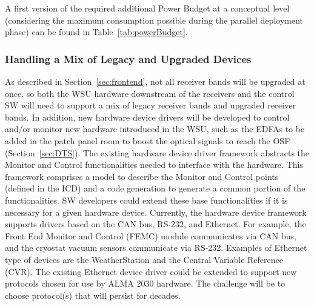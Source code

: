 A first version of the required additional Power Budget at a conceptual level (considering the maximum consumption possible during the parallel deployment phase) can be found in Table~\ref{tab:powerBudget}.






\subsubsection{Handling a Mix of Legacy and Upgraded Devices}
\label{handling_legacy_upgraded_devices}
As described in Section~\ref{sec:frontend}, not all receiver bands will be upgraded at once, so both the WSU hardware downstream of the receivers and the control SW will need to support a mix of legacy receiver bands and upgraded receiver bands. In addition, new hardware device drivers will be developed to control and/or monitor new hardware introduced in the WSU, such as the EDFAs to be added in the patch panel room to boost the optical signals to reach the OSF (Section~\ref{sec:DTS}).   The existing hardware device driver framework abstracts the Monitor and Control functionalities needed to interface with the hardware. This framework comprises a model to describe the Monitor and Control points (defined in the ICD) and a code generation to generate a common portion of the functionalities. SW developers could extend these base functionalities if it is necessary for a given hardware device. Currently, the hardware device framework supports drivers based on the CAN bus, RS-232, and Ethernet. For example, the Front End Monitor and Control (FEMC) module communicates via CAN bus, and the cryostat vacuum sensors communicate via RS-232.  Examples of Ethernet type of devices are the WeatherStation and the Central Variable Reference (CVR). The existing Ethernet device driver could be extended to support new protocols chosen for use by ALMA 2030 hardware. The challenge will be to choose protocol(s) that will persist for decades.

